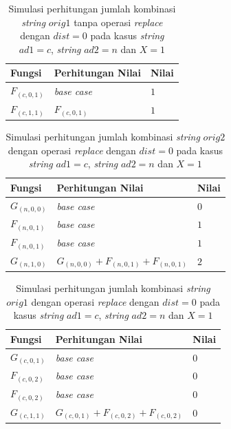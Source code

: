 \begin{appendices}
  
  \begin{table}[H]
  	\centering
  	\begin{tabular} {|p{3cm}|p{5cm}|p{1cm}|} \hline
  		Fungsi & Perhitungan Nilai & Nilai \\ \hline
  		$ F_{(c, 0, 1)} $ & \textit{base case} & $ 1 $ \\ \hline
  		\rowcolor{LightCyan}
  		$ F_{(c, 1, 1)}  $ & $F_{(c, 0, 1)}$ & $ 1 $ \\ \hline
  	\end{tabular}\caption{Simulasi perhitungan jumlah kombinasi \textit{string} $ orig1 $ tanpa operasi \textit{replace} dengan $ dist= 0  $ pada kasus \textit{string} $ ad1=c $, \textit{string} $ ad2=n $ dan $ X=1 $}
  	\label{tab:f_2_orig1_0_1}
  \end{table}
  
  \begin{table}[H]
  	\centering
  	\begin{tabular} {|p{3cm}|p{5cm}|p{1cm}|} \hline
  		Fungsi & Perhitungan Nilai & Nilai \\ \hline
  		$ G_{(n, 0, 0)} $ & \textit{base case} & $ 0 $ \\ \hline
  		$ F_{(n, 0, 1)} $ & \textit{base case} & $ 1 $ \\ \hline
  		$ F_{(n, 0, 1)} $ & \textit{base case} & $ 1 $ \\ \hline
  		\rowcolor{LightCyan}
  		$ G_{(n, 1, 0)}  $ & $G_{(n, 0, 0)} + F_{(n, 0, 1)} + F_{(n, 0, 1)}$ & $ 2 $ \\ \hline
  	\end{tabular}\caption{Simulasi perhitungan jumlah kombinasi \textit{string} $ orig2 $ dengan operasi \textit{replace} dengan $ dist= 0  $ pada kasus \textit{string} $ ad1=c $, \textit{string} $ ad2=n $ dan $ X=1 $}
  	\label{tab:g_2_orig2_0_1}
  \end{table}
  
  \begin{table}[H]
  	\centering
  	\begin{tabular} {|p{3cm}|p{5cm}|p{1cm}|} \hline
  		Fungsi & Perhitungan Nilai & Nilai \\ \hline
  		$ G_{(c, 0, 1)} $ & \textit{base case} & $ 0 $ \\ \hline
  		$ F_{(c, 0, 2)} $ & \textit{base case} & $ 0 $ \\ \hline
  		$ F_{(c, 0, 2)} $ & \textit{base case} & $ 0 $ \\ \hline
  		\rowcolor{LightCyan}
  		$ G_{(c, 1, 1)}  $ & $G_{(c, 0, 1)} + F_{(c, 0, 2)} + F_{(c, 0, 2)}$ & $ 0 $ \\ \hline
  	\end{tabular}\caption{Simulasi perhitungan jumlah kombinasi \textit{string} $ orig1 $ dengan operasi \textit{replace} dengan $ dist= 0  $ pada kasus \textit{string} $ ad1=c $, \textit{string} $ ad2=n $ dan $ X=1 $}
  	\label{tab:g_2_orig1_0_1}
  \end{table}
  

\end{appendices}
